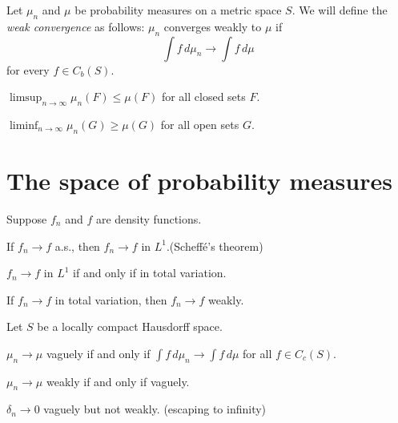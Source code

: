 \documentclass{../note}
\begin{document}

\begin{prb}
Let $\mu_n$ and $\mu$ be probability measures on a metric space $S$.
We will define the \emph{weak convergence} as follows: $\mu_n$ converges weakly to $\mu$ if
\[\int f\,d\mu_n\to\int f\,d\mu\]
for every $f\in C_b(S)$.
\begin{parts}
\item $\limsup_{n\to\infty}\mu_n(F)\le\mu(F)$ for all closed sets $F$.
\item $\liminf_{n\to\infty}\mu_n(G)\ge\mu(G)$ for all open sets $G$.
\end{parts}
\end{prb}


\begin{prb}
\end{prb}

\begin{prb}
\end{prb}

\begin{prb}
\end{prb}




\section{The space of probability measures}
\begin{prb}
Suppose $f_n$ and $f$ are density functions.
\begin{parts}
\item If $f_n\to f$ a.s., then $f_n\to f$ in $L^1$.\hfill(Scheff\'e's theorem)
\item $f_n\to f$ in $L^1$ if and only if in total variation.
\item If $f_n\to f$ in total variation, then $f_n\to f$ weakly.
\end{parts}
\end{prb}

\begin{prb}
Let $S$ be a locally compact Hausdorff space.
\begin{parts}
\item $\mu_n\to\mu$ vaguely if and only if $\int f\,d\mu_n\to\int f\,d\mu$ for all $f\in C_c(S)$.
\item $\mu_n\to\mu$ weakly if and only if vaguely.
\item $\delta_n\to0$ vaguely but not weakly. (escaping to infinity)
\end{parts}
\end{prb}
\begin{pf}
\end{pf}
\end{document}
